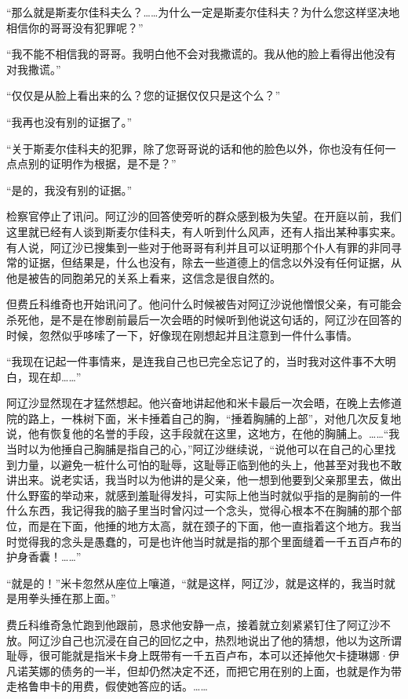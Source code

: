 \par “那么就是斯麦尔佳科夫么？……为什么一定是斯麦尔佳科夫？为什么您这样坚决地相信你的哥哥没有犯罪呢？”
\par “我不能不相信我的哥哥。我明白他不会对我撒谎的。我从他的脸上看得出他没有对我撒谎。”
\par “仅仅是从脸上看出来的么？您的证据仅仅只是这个么？”
\par “我再也没有别的证据了。”
\par “关于斯麦尔佳科夫的犯罪，除了您哥哥说的话和他的脸色以外，你也没有任何一点点别的证明作为根据，是不是？”
\par “是的，我没有别的证据。”
\par 检察官停止了讯问。阿辽沙的回答使旁听的群众感到极为失望。在开庭以前，我们这里就已经有人谈到斯麦尔佳科夫，有人听到什么风声，还有人指出某种事实来。有人说，阿辽沙已搜集到一些对于他哥哥有利并且可以证明那个仆人有罪的非同寻常的证据，但结果是，什么也没有，除去一些道德上的信念以外没有任何证据，从他是被告的同胞弟兄的关系上看来，这信念是很自然的。
\par 但费丘科维奇也开始讯问了。他问什么时候被告对阿辽沙说他憎恨父亲，有可能会杀死他，是不是在惨剧前最后一次会晤的时候听到他说这句话的，阿辽沙在回答的时候，忽然似乎哆嗦了一下，好像现在刚想起并且注意到一件什么事情。
\par “我现在记起一件事情来，是连我自己也已完全忘记了的，当时我对这件事不大明白，现在却……”
\par 阿辽沙显然现在才猛然想起。他兴奋地讲起他和米卡最后一次会晤，在晚上去修道院的路上，一株树下面，米卡捶着自己的胸，“捶着胸脯的上部”，对他几次反复地说，他有恢复他的名誉的手段，这手段就在这里，这地方，在他的胸脯上。……“我当时以为他捶自己胸脯是指自己的心，”阿辽沙继续说，“说他可以在自己的心里找到力量，以避免一桩什么可怕的耻辱，这耻辱正临到他的头上，他甚至对我也不敢讲出来。说老实话，我当时以为他讲的是父亲，他一想到他要到父亲那里去，做出什么野蛮的举动来，就感到羞耻得发抖，可实际上他当时就似乎指的是胸前的一件什么东西，我记得我的脑子里当时曾闪过一个念头，觉得心根本不在胸脯的那个部位，而是在下面，他捶的地方太高，就在颈子的下面，他一直指着这个地方。我当时觉得我的念头是愚蠢的，可是也许他当时就是指的那个里面缝着一千五百卢布的护身香囊！……”
\par “就是的！”米卡忽然从座位上嚷道，“就是这样，阿辽沙，就是这样的，我当时就是用拳头捶在那上面。”
\par 费丘科维奇急忙跑到他跟前，恳求他安静一点，接着就立刻紧紧钉住了阿辽沙不放。阿辽沙自己也沉浸在自己的回忆之中，热烈地说出了他的猜想，他以为这所谓耻辱，很可能就是指米卡身上既带有一千五百卢布，本可以还掉他欠卡捷琳娜·伊凡诺芙娜的债务的一半，但却仍然决定不还，而把它用在别的上面，也就是作为带走格鲁申卡的用费，假使她答应的话。……
